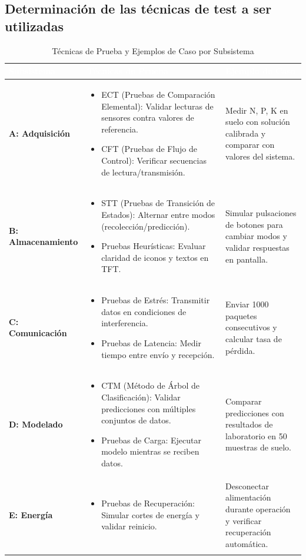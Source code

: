 \documentclass[12pt,a4paper, twosite]{article}
\begin{document}
\subsection{Determinación de las técnicas de test a ser utilizadas}

\begin{longtable}{|p{5cm}|p{5cm}|p{5cm}|}
  \hline
  \cellcolor[HTML]{4472C4}\textcolor{white}{\textbf{Subsistema}} & \cellcolor[HTML]{4472C4}\textcolor{white}{\textbf{Técnicas de Prueba}} & \cellcolor[HTML]{4472C4}\textcolor{white}{\textbf{Ejemplo de Caso}} \\ \hline
  \textbf{A: Adquisición} & 
  \begin{itemize}
    \item ECT (Pruebas de Comparación Elemental): Validar lecturas de sensores contra valores de referencia.
    \item CFT (Pruebas de Flujo de Control): Verificar secuencias de lectura/transmisión.
  \end{itemize}
  & Medir N, P, K en suelo con solución calibrada y comparar con valores del sistema. \\ \hline
  \textbf{B: Almacenamiento} & 
  \begin{itemize}
    \item STT (Pruebas de Transición de Estados): Alternar entre modos (recolección/predicción).
    \item Pruebas Heurísticas: Evaluar claridad de iconos y textos en TFT.
  \end{itemize}
  & Simular pulsaciones de botones para cambiar modos y validar respuestas en pantalla. \\ \hline
  \textbf{C: Comunicación} & 
  \begin{itemize}
    \item Pruebas de Estrés: Transmitir datos en condiciones de interferencia.
    \item Pruebas de Latencia: Medir tiempo entre envío y recepción.
  \end{itemize}
  & Enviar 1000 paquetes consecutivos y calcular tasa de pérdida. \\ \hline
  \textbf{D: Modelado} & 
  \begin{itemize}
    \item CTM (Método de Árbol de Clasificación): Validar predicciones con múltiples conjuntos de datos.
    \item Pruebas de Carga: Ejecutar modelo mientras se reciben datos.
  \end{itemize}
  & Comparar predicciones con resultados de laboratorio en 50 muestras de suelo. \\ \hline
  \textbf{E: Energía} & 
  \begin{itemize}
    \item Pruebas de Recuperación: Simular cortes de energía y validar reinicio.
  \end{itemize}
  & Desconectar alimentación durante operación y verificar recuperación automática. \\ \hline
  \caption{Técnicas de Prueba y Ejemplos de Caso por Subsistema} \label{tab:tecnicas_y_casos} \\
\end{longtable}
\newpage
\end{document}
